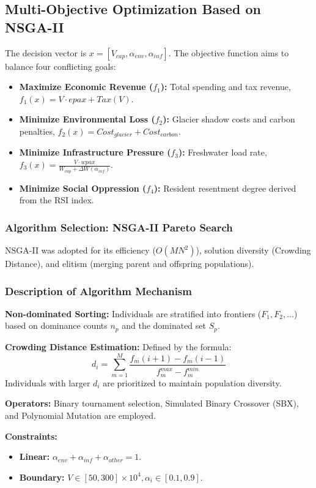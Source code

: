 \documentclass{mcmthesis}
\begin{document}
\subsection{Multi-Objective Optimization Based on NSGA-II}
The decision vector is $x = [V_{cap}, \alpha_{env}, \alpha_{inf}]$. The objective function aims to balance four conflicting goals:

\begin{itemize}
    \item \textbf{Maximize Economic Revenue ($f_1$):} Total spending and tax revenue, $f_1(x) = V \cdot epax + Tax(V)$.
    \item \textbf{Minimize Environmental Loss ($f_2$):} Glacier shadow costs and carbon penalties, $f_2(x) = Cost_{glacier} + Cost_{carbon}$.
    \item \textbf{Minimize Infrastructure Pressure ($f_3$):} Freshwater load rate, $f_3(x) = \frac{V \cdot wpax}{W_{cap} + \Delta W(\alpha_{inf})}$.
    \item \textbf{Minimize Social Oppression ($f_4$):} Resident resentment degree derived from the RSI index.
\end{itemize}

\subsubsection{Algorithm Selection: NSGA-II Pareto Search}
NSGA-II \cite{Deb2002} was adopted for its efficiency ($O(MN^2)$), solution diversity (Crowding Distance), and elitism (merging parent and offspring populations).

\subsubsection{Description of Algorithm Mechanism}
\textbf{Non-dominated Sorting:} Individuals are stratified into frontiers ($F_1, F_2, \ldots$) based on dominance counts $n_p$ and the dominated set $S_p$.

\textbf{Crowding Distance Estimation:} Defined by the formula:
\begin{equation}
d_i = \sum_{m=1}^M \frac{f_m(i+1) - f_m(i-1)}{f_m^{max} - f_m^{min}}
\end{equation}
Individuals with larger $d_i$ are prioritized to maintain population diversity.

\textbf{Operators:} Binary tournament selection, Simulated Binary Crossover (SBX), and Polynomial Mutation are employed.

\textbf{Constraints:}
\begin{itemize}
    \item \textbf{Linear:} $\alpha_{env} + \alpha_{inf} + \alpha_{other} = 1$.
    \item \textbf{Boundary:} $V \in [50, 300] \times 10^4, \alpha_i \in [0.1, 0.9]$.
\end{itemize}
\end{document}
